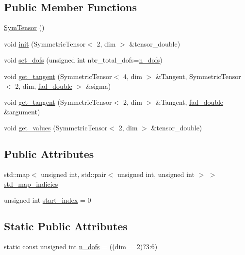 \subsection*{Public Member Functions}
\begin{DoxyCompactItemize}
\item 
\hyperlink{classSacado__Wrapper_1_1SymTensor_a4e7ec32177eb891e3f1a32a16bcd59f5}{Sym\+Tensor} ()
\item 
void \hyperlink{classSacado__Wrapper_1_1SymTensor_acbad579d5ead9e96ff46aa15d9b5aef4}{init} (Symmetric\+Tensor$<$ 2, dim $>$ \&tensor\+\_\+double)
\item 
void \hyperlink{classSacado__Wrapper_1_1SymTensor_aa9e0fcc9d4e0a4120bedb8ef9b8d7ecb}{set\+\_\+dofs} (unsigned int nbr\+\_\+total\+\_\+dofs=\hyperlink{classSacado__Wrapper_1_1SymTensor_a733bc4b029ff8d067b48e7ce3ee7606b}{n\+\_\+dofs})
\item 
void \hyperlink{classSacado__Wrapper_1_1SymTensor_ab97427c3b5cab279e58607cf431ab262}{get\+\_\+tangent} (Symmetric\+Tensor$<$ 4, dim $>$ \&Tangent, Symmetric\+Tensor$<$ 2, dim, \hyperlink{Sacado__example_8cc_a868b94676739e612d9c95940e70892a9}{fad\+\_\+double} $>$ \&sigma)
\item 
void \hyperlink{classSacado__Wrapper_1_1SymTensor_ac0ab9caa8c54102e24c4d007f820873b}{get\+\_\+tangent} (Symmetric\+Tensor$<$ 2, dim $>$ \&Tangent, \hyperlink{Sacado__example_8cc_a868b94676739e612d9c95940e70892a9}{fad\+\_\+double} \&argument)
\item 
void \hyperlink{classSacado__Wrapper_1_1SymTensor_afbab1ce0f846f026f5bd8b449180b5e9}{get\+\_\+values} (Symmetric\+Tensor$<$ 2, dim $>$ \&tensor\+\_\+double)
\end{DoxyCompactItemize}
\subsection*{Public Attributes}
\begin{DoxyCompactItemize}
\item 
std\+::map$<$ unsigned int, std\+::pair$<$ unsigned int, unsigned int $>$ $>$ \hyperlink{classSacado__Wrapper_1_1SymTensor_ae3b1c56cde3fc5c7805b618ef3d9de75}{std\+\_\+map\+\_\+indicies}
\item 
unsigned int \hyperlink{classSacado__Wrapper_1_1SymTensor_afe921e6044e4110fcfc848c52844d650}{start\+\_\+index} = 0
\end{DoxyCompactItemize}
\subsection*{Static Public Attributes}
\begin{DoxyCompactItemize}
\item 
static const unsigned int \hyperlink{classSacado__Wrapper_1_1SymTensor_a733bc4b029ff8d067b48e7ce3ee7606b}{n\+\_\+dofs} = ((dim==2)?3\+:6)
\end{DoxyCompactItemize}


